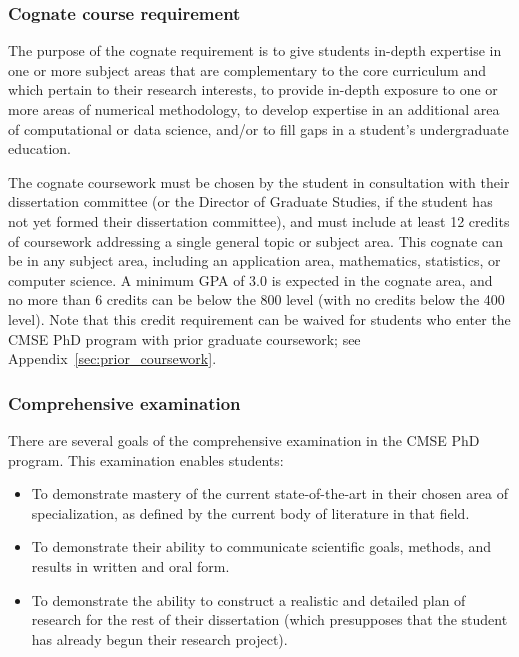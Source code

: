 \vspace{3mm}
\subsubsection{Cognate course requirement}
\label{sec:cognate_course}

The purpose of the cognate requirement is to give students in-depth
expertise in one or more subject areas that are complementary to the
core curriculum and which pertain to their research interests, to
provide in-depth exposure to one or more areas of numerical
methodology, to develop expertise in an additional area of
computational or data science, and/or to fill gaps in a student's
undergraduate education.

The cognate coursework must be chosen by the student in consultation
with their dissertation committee (or the Director of Graduate
Studies, if the student has not yet formed their dissertation
committee), and must include at least 12 credits of 
coursework addressing a single general topic or subject area.  This
cognate can be in any subject area, including an application area,
mathematics, statistics, or computer science.  A minimum GPA of 3.0 is
expected in the cognate area, and no more than 6 credits can be below
the 800 level (with no credits below the 400 level).  Note that this
credit requirement can be waived for students who enter the CMSE PhD
program with prior graduate coursework; see
Appendix~\ref{sec:prior_coursework}.

\vspace{3mm}
\subsubsection{Comprehensive examination}
\label{sec:comp_exam}

There are several goals of the comprehensive examination in the CMSE
PhD program.  This examination enables students:

\begin{itemize}
\item To demonstrate mastery of the current state-of-the-art in their
  chosen area of specialization, as defined by the current body of
  literature in that field.

\item To demonstrate their ability to communicate scientific goals,
  methods, and results in written and oral form. 

\item To demonstrate the ability to construct a realistic and detailed
  plan of research for the rest of their dissertation (which
  presupposes that the student has already begun their research project).

\end{itemize}

